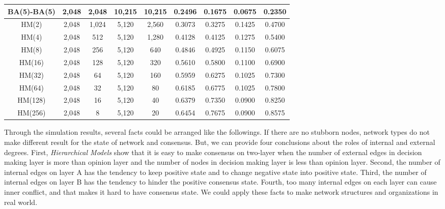 \begin{table}[!htb]
\begin{center}
\begin{tabular}{c|c|c|c|c|c|c|c|c}
			BA(5)-BA(5)            & 2,048 	& 2,048   & 10,215  & 10,215  &  0.2496   & 0.1675 & 0.0675 & 0.2350   \\ \hline
			HM(2)  				   & 2,048 	& 1,024   & 5,120   & 2,560   &  0.3073   & 0.3275 & 0.1425 & 0.4700   \\ \hline    
			HM(4) 				   & 2,048 	&  512    & 5,120   & 1,280   &  0.4128   & 0.4125 & 0.1275 & 0.5400   \\ \hline
			HM(8)  				   & 2,048 	&  256    & 5,120   & 640     &  0.4846   & 0.4925 & 0.1150 & 0.6075   \\ \hline
			HM(16)				   & 2,048 	&  128    & 5,120   & 320     &  0.5610   & 0.5800 & 0.1100 & 0.6900   \\ \hline
			HM(32) 				   & 2,048 	&   64    & 5,120   & 160     &  0.5959   & 0.6275 & 0.1025 & 0.7300   \\ \hline
			HM(64) 				   & 2,048 	&   32    & 5,120   & 80      &  0.6185   & 0.6775 & 0.1025 & 0.7800   \\ \hline 
			HM(128) 			   & 2,048 	&   16    & 5,120   & 40      &  0.6379   & 0.7350 & 0.0900 & 0.8250   \\ \hline 
			HM(256) 			   & 2,048 	&    8    & 5,120   & 20      &  0.6454   & 0.7675 & 0.0900 & 0.8575   \\ \hline 
			 \hline
		\end{tabular}
	\end{center}
\end{table} 

Through the simulation results, several facts could be arranged like the followings. If there are no stubborn nodes, network types do not make different result for the state of network and consensus. But, we can provide four conclusions about the roles of internal and external degrees. First, \textit{Hierarchical Models} show that it is easy to make consensus on two-layer when the number of external edges in decision making layer is more than opinion layer and the number of nodes in decision making layer is less than opinion layer. Second, the number of internal edges on layer A has the tendency to keep positive state and to change negative state into positive state. Third, the number of internal edges on layer B has the tendency to hinder the positive consensus state. Fourth, too many internal edges on each layer can cause inner conflict, and that makes it hard to have consensus state. We could apply these facts to make network structures and organizations in real world. \\
